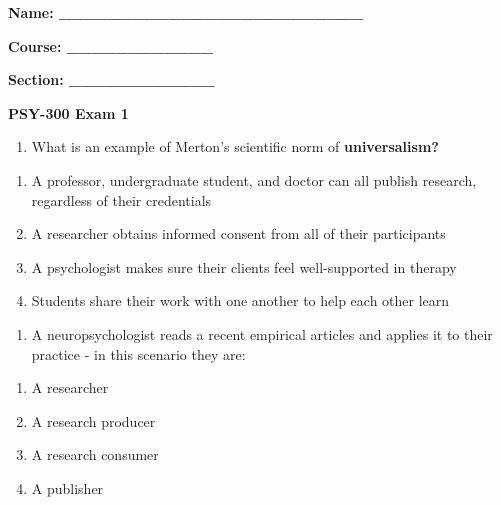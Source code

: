 \documentclass[
  12pt,
  letterpaper,
  DIV=11,
  numbers=noendperiod]{scrartcl}
\author{}
\date{}
\providecommand{\tightlist}{%
  \setlength{\itemsep}{0pt}\setlength{\parskip}{0pt}}\usepackage{longtable,booktabs,array}
\begin{document}

\pagestyle{scrheadings}

\frenchspacing %


\textbf{Name: \_\_\_\_\_\_\_\_\_\_\_\_\_\_\_\_\_\_\_\_\_\_\_\_\_}

\textbf{Course: \_\_\_\_\_\_\_\_\_\_\_\_}

\textbf{Section: \_\_\_\_\_\_\_\_\_\_\_\_}

\textbf{PSY-300 Exam 1}

\begin{enumerate}
\def\labelenumi{\arabic{enumi}.}
\tightlist
\item
  What is an example of Merton's scientific norm of
  \textbf{universalism?}
\end{enumerate}

\begin{enumerate}
\def\labelenumi{\alph{enumi}.}
\tightlist
\item
  A professor, undergraduate student, and doctor can all publish
  research, regardless of their credentials
\item
  A researcher obtains informed consent from all of their participants
\item
  A psychologist makes sure their clients feel well-supported in therapy
\item
  Students share their work with one another to help each other learn
\end{enumerate}

\begin{enumerate}
\def\labelenumi{\arabic{enumi}.}
\setcounter{enumi}{1}
\tightlist
\item
  A neuropsychologist reads a recent empirical articles and applies it
  to their practice - in this scenario they are:
\end{enumerate}

\begin{enumerate}
\def\labelenumi{\alph{enumi}.}
\tightlist
\item
  A researcher
\item
  A research producer
\item
  A research consumer
\item
  A publisher
\end{enumerate}
\end{document}
